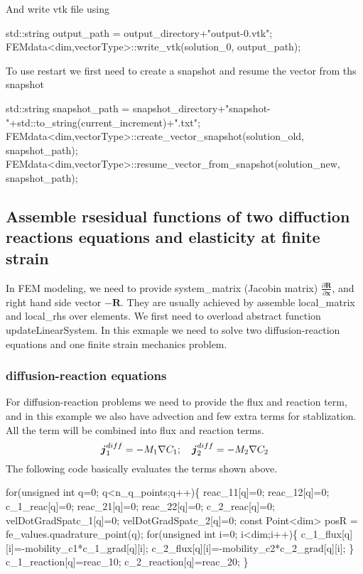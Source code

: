  And write vtk file using 
\begin{DoxyCode}
std::string output\_path = output\_directory+\textcolor{stringliteral}{"output-0.vtk"};
FEMdata<dim,vectorType>::write_vtk(solution\_0, output\_path);
\end{DoxyCode}
 To use restart we first need to create a snapshot and resume the vector from ths snapshot 
\begin{DoxyCode}
std::string snapshot\_path = snapshot\_directory+\textcolor{stringliteral}{"snapshot-"}+std::to\_string(current\_increment)+\textcolor{stringliteral}{".txt"};
FEMdata<dim,vectorType>::create_vector_snapshot(solution\_old, snapshot\_path);
FEMdata<dim,vectorType>::resume_vector_from_snapshot(solution\_new, snapshot\_path);
\end{DoxyCode}
 \hypertarget{brain_morph_assemble}{}\subsection{Assemble rsesidual functions of two diffuction reactions equations and elasticity at finite strain}\label{brain_morph_assemble}
In F\-E\-M modeling, we need to provide system\-\_\-matrix (Jacobin matrix) $\frac{\partial \boldsymbol{R}}{\partial \boldsymbol{x}} $, and right hand side vector $-\boldsymbol{R}$. They are usually achieved by assemble {\ttfamily local\-\_\-matrix} and {\ttfamily local\-\_\-rhs} over elements. We first need to overload abstract function {\ttfamily update\-Linear\-System}. In this exmaple we need to solve two diffusion-\/reaction equations and one finite strain mechanics problem. \hypertarget{brain_morph_DRq}{}\subsubsection{diffusion-\/reaction equations}\label{brain_morph_DRq}
For diffusion-\/reaction problems we need to provide the flux and reaction term, and in this example we also have advection and few extra terms for stablization. All the term will be combined into {\ttfamily flux} and {\ttfamily reaction} terms. \[ \boldsymbol{j}_1^{diff}=-M_1\nabla C_\text{1}; \quad \boldsymbol{j}_2^{diff}=-M_2\nabla C_\text{2}\\ \] The following code basically evaluates the terms shown above. 
\begin{DoxyCode}
\textcolor{keywordflow}{for}(\textcolor{keywordtype}{unsigned} \textcolor{keywordtype}{int} q=0; q<n\_q\_points;q++)\{
    reac\_11[q]=0; reac\_12[q]=0; c\_1\_reac[q]=0; 
    reac\_21[q]=0; reac\_22[q]=0; c\_2\_reac[q]=0; 
    velDotGradSpatc\_1[q]=0;
    velDotGradSpatc\_2[q]=0;
    \textcolor{keyword}{const} Point<dim> posR = fe\_values.quadrature\_point(q);
    \textcolor{keywordflow}{for}(\textcolor{keywordtype}{unsigned} \textcolor{keywordtype}{int} i=0; i<dim;i++)\{
        c\_1\_flux[q][i]=-mobility\_c1*c\_1\_grad[q][i];
        c\_2\_flux[q][i]=-mobility\_c2*c\_2\_grad[q][i];
    \}       
    c\_1\_reaction[q]=reac\_10;
    c\_2\_reaction[q]=reac\_20;
\}
\end{DoxyCode}
